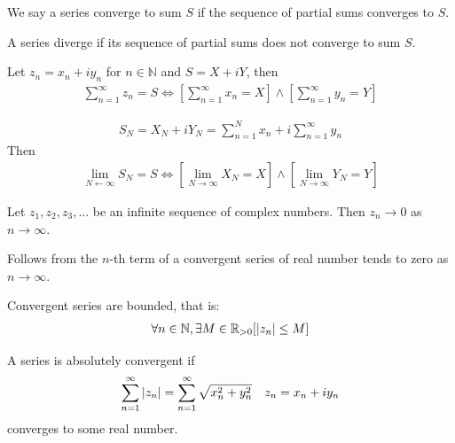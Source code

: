 \documentclass[12pt, english]{book}
\makeatletter
\renewenvironment{proof}[1][\proofname]{\par
	\pushQED{\qed}%
	\normalfont \topsep6\p@\@plus6\p@\relax
	\list{}{%
		\settowidth{\leftmargin}{\itshape\proofname:\hskip\labelsep}%
		\setlength{\labelwidth}{0pt}%
		\setlength{\itemindent}{-\leftmargin}%
	}%
	\item[\hskip\labelsep\itshape#1\@addpunct{:}]\ignorespaces
	}{ \popQED\endlist\@endpefalse}
\makeatother
\begin{document}
	\begin{definition}
		We say a series converge to sum \(S\) if the sequence of partial sums converges to \(S\).
	\end{definition}

	\begin{definition}
		A series diverge if its sequence of partial sums does not converge to sum \(S\).
	\end{definition}
	
	\begin{theorem}
		Let \(z_n = x_n + iy_n\) for \(n \in \mathbb{N}\) and \(S = X + iY\), then
		\begin{align*}
			\sum_{n = 1}^{\infty} z_n = S 
			\iff \left[ \sum_{n = 1}^{\infty} x_n = X \right] \land 
				 \left[ \sum_{n = 1}^{\infty} y_n = Y \right]
		\end{align*}
	\end{theorem}
	\begin{proof}
		\begin{align*}
			S_N = X_N + iY_N = \sum_{n=1}^{N} x_n + i \sum_{n=1}^{\infty} y_n
		\end{align*}
		Then
		\begin{align*}
			\lim_{N \leftarrow \infty} S_N = S 
			\iff \left[ \lim_{N \rightarrow \infty} X_N = X  \right]
			\land  \left[ \lim_{N \rightarrow \infty} Y_N = Y  \right]
		\end{align*}
	\end{proof}

	\begin{corollary}
		Let \(z_1, z_2, z_3, \ldots \) be an infinite sequence of complex numbers. Then \(z_n \rightarrow 0\) as \(n \rightarrow \infty\).
	\end{corollary}
	\begin{proof}
		Follows from the \(n\)-th term of a convergent series of real number tends to zero as \(n \rightarrow \infty\).
	\end{proof}
	
	\begin{corollary}
		Convergent series are bounded, that is:
		\begin{align*}
			\forall n \in \mathbb{N}, \exists M \in \mathbb{R}_{>0} [\abs{z_n} \leq M]
		\end{align*}
	\end{corollary}
	
	\begin{definition}
		A series is absolutely convergent if
		\begin{align*}
			\sum_{n=1}^{\infty} \abs{z_n} &= \sum_{n=1}^{\infty} \sqrt{x_n^2 + y_n^2} 
				& z_n = x_n + iy_n
		\end{align*}
		converges to some real number. 
	\end{definition}
\end{document}
